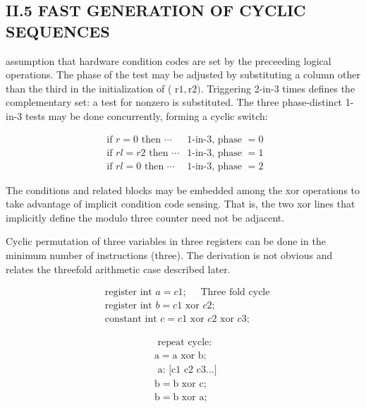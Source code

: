 \begin{CJK}{UTF8}{gbsn}
\section{II.5 FAST GENERATION OF CYCLIC SEQUENCES}
assumption that hardware condition codes are set by the preceeding logical operations. The phase of the test may be adjusted by substituting a column other than the third in the initialization of ( $\mathrm{r} 1, \mathrm{r} 2)$. Triggering 2-in-3 times defines the complementary set: a test for nonzero is substituted. The three phase-distinct 1-in-3 tests may be done concurrently, forming a cyclic switch:

$$
\begin{array}{ll}
\text { if } r=0 \text { then } \cdots & 1 \text {-in-3, phase }=0 \\
\text { if } r l=r 2 \text { then } \cdots & 1 \text {-in-3, phase }=1 \\
\text { if } r l=0 \text { then } \cdots & 1 \text {-in-3, phase }=2
\end{array}
$$

The conditions and related blocks may be embedded among the xor operations to take advantage of implicit condition code sensing. That is, the two xor lines that implicitly define the modulo three counter need not be adjacent.

Cyclic permutation of three variables in three registers can be done in the minimum number of instructions (three). The derivation is not obvious and relates the threefold arithmetic case described later.

$$
\begin{aligned}
&\text { register int } a=c 1 ; \quad \text { Three fold cycle } \\
&\text { register int } b=c 1 \text { xor } c 2 \text {; } \\
&\text { constant int } c=c 1 \text { xor } c 2 \text { xor } c 3 \text {; }
\end{aligned}
$$

$$
\begin{aligned}
& \text { repeat cycle: } \\
& \mathrm{a}=\mathrm{a} \text { xor } \mathrm{b} \text {; } \\
& \text { a: [c1 c2 c3...] } \\
& \mathrm{b}=\mathrm{b} \text { xor } \mathrm{c} \text {; } \\
& \mathrm{b}=\mathrm{b} \text { xor } \mathrm{a} \text {; }
\end{aligned}
$$


\end{CJK}
